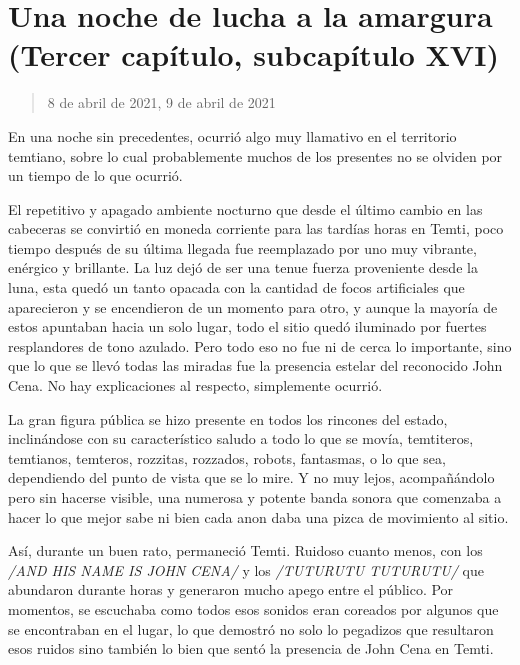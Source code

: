 \documentclass[
  spanish,
]{book}
\begin{document}
\hypertarget{una-noche-de-lucha-a-la-amargura-tercer-capuxedtulo-subcapuxedtulo-xvi}{%
\section{Una noche de lucha a la amargura (Tercer capítulo, subcapítulo XVI)}\label{una-noche-de-lucha-a-la-amargura-tercer-capuxedtulo-subcapuxedtulo-xvi}}

\begin{quote}
8 de abril de 2021, 9 de abril de 2021
\end{quote}

En una noche sin precedentes, ocurrió algo muy llamativo en el territorio temtiano, sobre lo cual probablemente muchos de los presentes no se olviden por un tiempo de lo que ocurrió.

El repetitivo y apagado ambiente nocturno que desde el último cambio en las cabeceras se convirtió en moneda corriente para las tardías horas en Temti, poco tiempo después de su última llegada fue reemplazado por uno muy vibrante, enérgico y brillante. La luz dejó de ser una tenue fuerza proveniente desde la luna, esta quedó un tanto opacada con la cantidad de focos artificiales que aparecieron y se encendieron de un momento para otro, y aunque la mayoría de estos apuntaban hacia un solo lugar, todo el sitio quedó iluminado por fuertes resplandores de tono azulado. Pero todo eso no fue ni de cerca lo importante, sino que lo que se llevó todas las miradas fue la presencia estelar del reconocido John Cena. No hay explicaciones al respecto, simplemente ocurrió.

La gran figura pública se hizo presente en todos los rincones del estado, inclinándose con su característico saludo a todo lo que se movía, temtiteros, temtianos, temteros, rozzitas, rozzados, robots, fantasmas, o lo que sea, dependiendo del punto de vista que se lo mire. Y no muy lejos, acompañándolo pero sin hacerse visible, una numerosa y potente banda sonora que comenzaba a hacer lo que mejor sabe ni bien cada anon daba una pizca de movimiento al sitio.

Así, durante un buen rato, permaneció Temti. Ruidoso cuanto menos, con los \emph{/AND HIS NAME IS JOHN CENA/} y los \emph{/TUTURUTU TUTURUTU/} que abundaron durante horas y generaron mucho apego entre el público. Por momentos, se escuchaba como todos esos sonidos eran coreados por algunos que se encontraban en el lugar, lo que demostró no solo lo pegadizos que resultaron esos ruidos sino también lo bien que sentó la presencia de John Cena en Temti.
\end{document}

